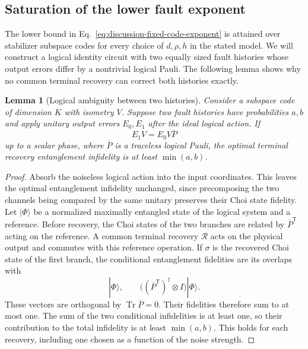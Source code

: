 \documentclass[aps,prl,reprint,longbibliography,nofootinbib,nobibnotes]{revtex4-2}
\newtheorem{lemma}{Lemma}
\newcommand{\id}{I}
\newcommand{\tr}{\operatorname{Tr}}
\begin{document}
\subsection*{Saturation of the lower fault exponent}
\label{em:lower-saturation}

The lower bound in Eq.~\eqref{eq:discussion-fixed-code-exponent} is attained over stabilizer
subspace codes for every choice of $d,\rho,h$ in the stated model. We will construct a
logical identity circuit with two equally sized fault histories whose output errors differ by a
nontrivial logical Pauli. The following lemma shows why no common terminal recovery can correct
both histories exactly.

\begin{lemma}[Logical ambiguity between two histories]
\label{lem:two-pauli-histories}
Consider a subspace code of dimension $K$ with isometry $V$. Suppose two fault histories have
probabilities $a,b$ and apply unitary output errors $E_0,E_1$ after the ideal logical action. If
\[
 E_1V=E_0V\overline P
\]
up to a scalar phase, where $\overline P$ is a traceless logical Pauli, the optimal
terminal recovery entanglement infidelity is at least $\min(a,b)$.
\end{lemma}

\begin{proof}
Absorb the noiseless logical action into the input coordinates. This leaves the optimal
entanglement infidelity unchanged, since precomposing the two channels being compared by the same
unitary preserves their Choi state fidelity. Let $|\Phi\rangle$ be a normalized maximally entangled
state of the logical system and a reference. Before recovery, the Choi states of the two branches
are related by $\overline P^{\mathsf T}$ acting on the reference. A common terminal recovery
$\mathcal R$ acts on the physical output and commutes with this reference operation. If $\sigma$ is
the recovered Choi state of the first branch, the conditional entanglement fidelities are its
overlaps with
\[
 |\Phi\rangle,\qquad
 \bigl((\overline P^{\mathsf T})^\dagger\otimes\id\bigr)|\Phi\rangle.
\]
These vectors are orthogonal by $\tr\overline P=0$. Their fidelities therefore sum to at most one.
The sum of the two conditional infidelities is at least one, so their contribution to the total
infidelity is at least $\min(a,b)$. This holds for each recovery, including one chosen as a
function of the noise strength.
\end{proof}
\end{document}
